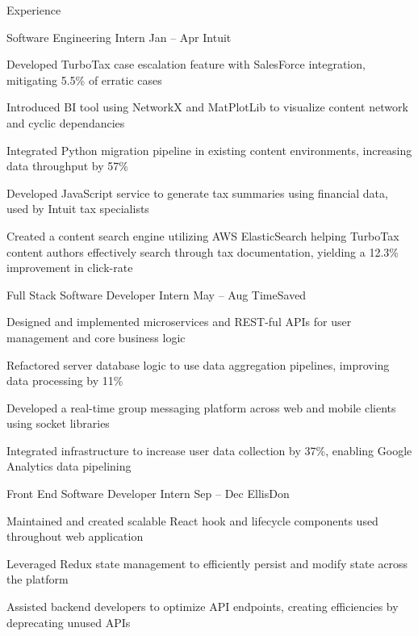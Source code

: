 \documentclass{resume} %
\begin{document}
\begin{rSection}{Experience}

  \begin{rWorkSection}{Software Engineering Intern}
                      {Jan -- Apr }
                      {Intuit}
                      {}
  {
    \item Developed TurboTax case escalation feature with SalesForce integration, mitigating 5.5{\%} of erratic cases 
    \item Introduced BI tool using NetworkX and MatPlotLib to visualize content network and cyclic dependancies
    \item Integrated Python migration pipeline in existing content environments, increasing data throughput by 57{\%}
    \item Developed JavaScript service to generate tax summaries using financial data, used by Intuit tax specialists
    \item Created a content search engine utilizing AWS ElasticSearch helping TurboTax content authors effectively search through tax documentation, yielding a 12.3{\%} improvement in click-rate
  }
  \end{rWorkSection}

  \begin{rWorkSection}{Full Stack Software Developer Intern}
                     {May -- Aug }
                     {TimeSaved}
                     {}
  {
    \item Designed and implemented microservices and REST-ful APIs for user management and core business logic
    \item Refactored server database logic to use data aggregation pipelines, improving data processing by 11{\%} 
    \item Developed a real-time group messaging platform across web and mobile clients using socket libraries
    \item Integrated infrastructure to increase user data collection by 37{\%}, enabling Google Analytics data pipelining
  }
  \end{rWorkSection}

 

  \begin{rWorkSection}{Front End Software Developer Intern}
                     {Sep -- Dec }
                     {EllisDon}
                     {}
  {
    \item Maintained and created scalable React hook and lifecycle components used throughout web application 
    \item Leveraged Redux state management to efficiently persist and modify state across the platform
    \item Assisted backend developers to optimize API endpoints, creating efficiencies by deprecating unused APIs
  }
  \end{rWorkSection}
\end{rSection}
\end{document}
